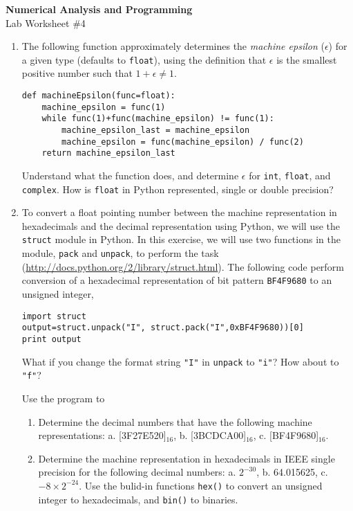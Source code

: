 \documentclass[12pt]{article}
\begin{document}
\begin{center}
\Large
\textbf{Numerical Analysis and Programming}\\
\large
Lab Worksheet \#4
\end{center}
\begin{enumerate}
\item The following function approximately determines the \textit{machine epsilon} ($\epsilon$) for a given type (defaults to \verb!float!), using the definition that $\epsilon$ is the smallest positive number such that $1+\epsilon\ne 1$. 
\small
\begin{verbatim}
def machineEpsilon(func=float):
    machine_epsilon = func(1)
    while func(1)+func(machine_epsilon) != func(1):
        machine_epsilon_last = machine_epsilon
        machine_epsilon = func(machine_epsilon) / func(2)
    return machine_epsilon_last
\end{verbatim}
\normalsize
Understand what the function does,  and determine $\epsilon$ for \verb!int!,  \verb!float!, and \verb!complex!. How is \verb!float! in Python represented, single or double precision? 



\item To convert a float pointing number  between the machine representation in hexadecimals and the decimal  representation using Python, we will use the \verb!struct! module in Python. In this exercise, we will  use two functions in the module, \verb!pack! and \verb!unpack!,  to perform the task (\url{http://docs.python.org/2/library/struct.html}).
The following code perform conversion of a hexadecimal representation of bit pattern \verb!BF4F9680! to an unsigned integer,  
\begin{verbatim}
import struct
output=struct.unpack("I", struct.pack("I",0xBF4F9680))[0]
print output
\end{verbatim}
 What if you change the format string \verb!"I"!  in \verb!unpack!  to \verb!"i"!? How about to \verb!"f"!?

Use the program to 
\begin{enumerate} 


\item Determine the decimal numbers that have the following machine representations: a. [3F27E520]$_{16}$,\;	b. [3BCDCA00]$_{16}$,\;	c. [BF4F9680]$_{16}$.
\item Determine the machine representation in hexadecimals in IEEE single precision for the following decimal numbers:
a. $2^{−30}$,\;	b. 64.015625,\;	c. $−8\times 2^{−24}$. Use the bulid-in functions \verb!hex()! to convert an unsigned integer to hexadecimals, and \verb!bin()! to binaries.
\end{enumerate}
\end{enumerate}
\end{document}
